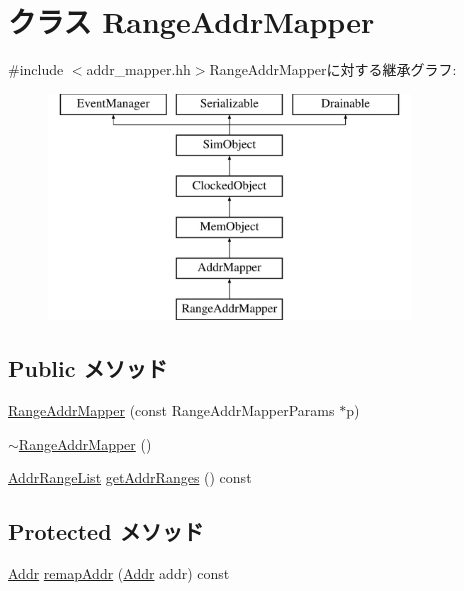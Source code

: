 \hypertarget{classRangeAddrMapper}{
\section{クラス RangeAddrMapper}
\label{classRangeAddrMapper}
}


{\ttfamily \#include $<$addr\_\-mapper.hh$>$}RangeAddrMapperに対する継承グラフ:\begin{figure}[H]
\begin{center}
\leavevmode
\includegraphics[height=6cm]{classRangeAddrMapper}
\end{center}
\end{figure}
\subsection*{Public メソッド}
\begin{DoxyCompactItemize}
\item 
\hyperlink{classRangeAddrMapper_a89f471283bbf7e257496688bb009e9e3}{RangeAddrMapper} (const RangeAddrMapperParams $\ast$p)
\item 
\hyperlink{classRangeAddrMapper_a5c60978309e5438ca580ba4cb9bd9a9e}{$\sim$RangeAddrMapper} ()
\item 
\hyperlink{classstd_1_1list}{AddrRangeList} \hyperlink{classRangeAddrMapper_a36cf113d5e5e091ebddb32306c098fae}{getAddrRanges} () const 
\end{DoxyCompactItemize}
\subsection*{Protected メソッド}
\begin{DoxyCompactItemize}
\item 
\hyperlink{base_2types_8hh_af1bb03d6a4ee096394a6749f0a169232}{Addr} \hyperlink{classRangeAddrMapper_a0991da7dcb180722b611eb4a58a397a6}{remapAddr} (\hyperlink{base_2types_8hh_af1bb03d6a4ee096394a6749f0a169232}{Addr} addr) const 
\end{DoxyCompactItemize}
